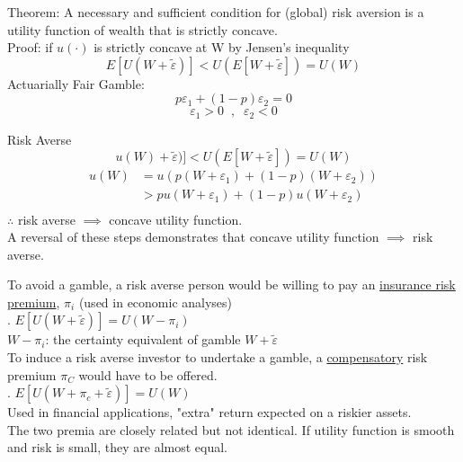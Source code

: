 \documentclass[
14pt,notheorems,hyperref={pdfauthor=whatever}
]{beamer}
\begin{document}
\begin{frame}
Theorem: A necessary and sufficient condition for (global) risk aversion is a utility function of wealth that is strictly concave.\\
\hfill \break
Proof: if $u(\cdot)$ is strictly concave at W by Jensen's inequality\\
\[ E[U(W+\tilde\varepsilon)] < U(E[W+\tilde\varepsilon]) = U(W)\]
\hfill \break
Actuarially Fair Gamble:\\
\[p\varepsilon_1+(1-p)\varepsilon_2 = 0\]
\[\varepsilon_1>0\;\;,\;\;\varepsilon_2<0\]
\end{frame}

\begin{frame}
Risk Averse\\
\hfill \break
\[ u(W)+\tilde\varepsilon)] < U(E[W+\tilde\varepsilon]) = U(W)\]
\begin{align*}
    u(W) &= u(p(W+\varepsilon_1)+(1-p)(W+\varepsilon_2))\\
    &> p u(W+\varepsilon_1)+(1-p)u(W+\varepsilon_2)\\
\end{align*}
$\therefore$ risk averse $\implies$ concave utility function.\\
\hfill\break
A reversal of these steps demonstrates that concave utility function $\implies$ risk averse.\\
\end{frame}

\begin{frame}
To avoid a gamble, a risk averse person would be willing to pay an \underline{insurance risk premium}, $\pi_i$ (used in economic analyses)\\
\hfill {}. $E[U(W+\tilde\varepsilon)] = U(W-\pi_i)$\\
\hfill \break
$W-\pi_i$: the certainty equivalent of gamble $W+\tilde\varepsilon$\\
To induce a risk averse investor to undertake a gamble, a \underline{compensatory} risk premium $\pi_C$ would have to be offered.\\
\hfill {}. $E[U(W+\pi_c+\tilde\varepsilon)] = U(W)$\\
\hfill \break
Used in financial applications, "extra" return expected on a riskier assets.\\
\hfill \break
The two premia are closely related but not identical. If utility function is smooth and risk is small, they are almost equal.\\
\end{frame}
\end{document}
